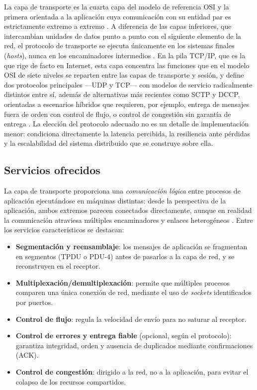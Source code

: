 \documentclass[conference]{IEEEtran}
\begin{document}
La capa de transporte es la cuarta capa del modelo de referencia OSI y la primera orientada a la aplicación cuya comunicación con su entidad par es estrictamente extremo a extremo \cite{tanenbaum}. A diferencia de las capas inferiores, que intercambian unidades de datos punto a punto con el siguiente elemento de la red, el protocolo de transporte se ejecuta únicamente en los sistemas finales (\textit{hosts}), nunca en los encaminadores intermedios \cite{kurose}. En la pila TCP/IP, que es la que rige de facto en Internet, esta capa concentra las funciones que en el modelo OSI de siete niveles se reparten entre las capas de transporte y sesión, y define dos protocolos principales —UDP y TCP— con modelos de servicio radicalmente distintos entre sí, además de alternativas más recientes como SCTP y DCCP, orientadas a escenarios híbridos que requieren, por ejemplo, entrega de mensajes fuera de orden con control de flujo, o control de congestión sin garantía de entrega \cite{fuoc}. La elección del protocolo adecuado no es un detalle de implementación menor: condiciona directamente la latencia percibida, la resiliencia ante pérdidas y la escalabilidad del sistema distribuido que se construye sobre ella.

\subsection{Servicios ofrecidos}

La capa de transporte proporciona una \emph{comunicación lógica} entre procesos de aplicación ejecutándose en máquinas distintas: desde la perspectiva de la aplicación, ambos extremos parecen conectados directamente, aunque en realidad la comunicación atraviesa múltiples encaminadores y enlaces heterogéneos \cite{fuoc}. Entre los servicios característicos se destacan:

\begin{itemize}
    \item \textbf{Segmentación y reensamblaje}: los mensajes de aplicación se fragmentan en segmentos (TPDU o PDU-4) antes de pasarlos a la capa de red, y se reconstruyen en el receptor.
    \item \textbf{Multiplexación/demultiplexación}: permite que múltiples procesos comparen una única conexión de red, mediante el uso de \textit{sockets} identificados por puertos.
    \item \textbf{Control de flujo}: regula la velocidad de envío para no saturar al receptor.
    \item \textbf{Control de errores y entrega fiable} (opcional, según el protocolo): garantiza integridad, orden y ausencia de duplicados mediante confirmaciones (ACK).
    \item \textbf{Control de congestión}: dirigido a la red, no a la aplicación, para evitar el colapso de los recursos compartidos.
\end{itemize}
\end{document}
